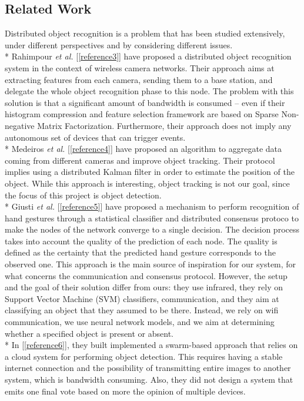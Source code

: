 \documentclass[10pt,conference,compsocconf]{IEEEtran}
\begin{document}
\subsection{Related Work}
Distributed object recognition is a problem that has been studied extensively, under different perspectives and by considering different issues.\\*
Rahimpour \textit{et al.} [\ref{reference3}] have proposed a distributed object recognition system in the context of wireless camera networks. Their approach aims at extracting features from each camera, sending them to a base station, and delegate the whole object recognition phase to this node. The problem with this solution is that a significant amount of bandwidth is consumed -- even if their histogram compression and feature selection framework are based on Sparse Non-negative Matrix Factorization. Furthermore, their approach does not imply any autonomous set of devices that can trigger events.\\*
Medeiros \textit{et al.} [\ref{reference4}] have proposed an algorithm to aggregate data coming from different cameras and improve object tracking. Their protocol implies using a distributed Kalman filter in order to estimate the position of the object. While this approach is interesting, object tracking is not our goal, since the focus of this project is object detection.\\*
Giusti \textit{et al.} [\ref{reference5}] have proposed a mechanism to perform recognition of hand gestures through a statistical classifier and distributed consensus protoco to make the nodes of the network converge to a single decision. The decision process takes into account the quality of the prediction of each node. The quality is defined as the certainty that the predicted hand gesture corresponds to the observed one. This approach is the main source of inspiration for our system, for what concerns the communication and consensus protocol. However, the setup and the goal of their solution differ from ours: they use infrared, they rely on Support Vector Machine (SVM) classifiers, communication, and they aim at classifying an object that they assumed to be there. Instead, we rely on wifi communication, we use neural network models, and we aim at determining whether a specified object is present or absent.\\*
In [\ref{reference6}], they built implemented a swarm-based approach that relies on a cloud system for performing object detection. This requires having a stable internet connection and the possibility of transmitting entire images to another system, which is bandwidth consuming. Also, they did not design a system that emits one final vote based on more the opinion of multiple devices.
\end{document}
